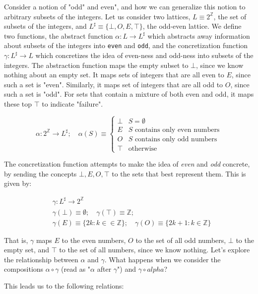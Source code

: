 \documentclass[11pt]{book}
\newcommand{\Z}{\ensuremath{\mathbb Z}}
\begin{document}
Consider a notion of "odd" and even", and how we can generalize this notion to arbitrary subsets of the integers.
Let us consider two lattices, $L \equiv 2^\Z$, the set of subsets of the integers, and $L^\sharp \equiv \{\bot, O, E, \top\}$,
the odd-even lattice. We define two functions, the abstract function $\alpha: L \rightarrow L^\sharp$ which abstracts away information about subsets of the integers into \texttt{even} and \texttt{odd}, and the concretization function $\gamma: L^\sharp \rightarrow L$ which
concretizes the idea of even-ness and odd-ness into subsets of the integers. The abstraction function maps the empty subset to $\bot$, since we know nothing about an empty set. It maps sets of integers that are all even to $E$, since such a set is "even". Similarly, it maps set of integers that are all odd to  $O$, since such a set is "odd". For sets that contain a mixture of both even and odd, it maps these top $\top$ to indicate "failure".

\[
	\alpha: 2^\Z\rightarrow L^\sharp; \quad
	\alpha(S) \equiv
	\begin{cases}
		\bot & S = \emptyset \\
		E & \text{$S$ contains only even numbers} \\
		O & \text{$S$ contains only odd numbers} \\
		\top & \text{otherwise}
	\end{cases}
\]

The concretization function attempts to make the idea of \emph{even} and \emph{odd} concrete, by sending the concepts $\bot, E, O, \top$ to the sets that best represent them. This is given by:

\begin{align*}
&\gamma: L^\sharp \rightarrow 2^\Z \\
&\gamma(\bot) \equiv \emptyset; \quad \gamma(\top) \equiv \Z; \\
&\gamma(E) \equiv \{ 2 k : k \in \in \Z\}; \quad
\gamma(O) \equiv \{ 2k + 1: k \in \Z \}
\end{align*}

That is, $\gamma$ maps $E$ to the even numbers, $O$ to the set of all odd numbers, $\bot$ to the empty set, and $\top$ to the set of all numbers, since we know nothing. Let's explore the relationship between $\alpha$ and $\gamma$. What happens  when we consider the compositions $\alpha \circ \gamma$ (read as "$\alpha$ after $\gamma$") and $\gamma \circ alpha$?

This leads us to the following relations:
\end{document}

